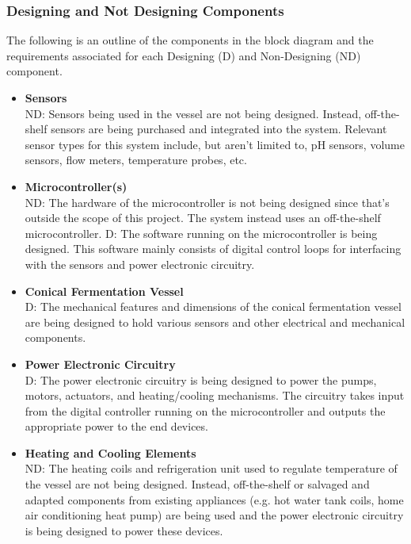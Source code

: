 \documentclass{article}
\begin{document}
\subsubsection{Designing and Not Designing Components}
The following is an outline of the components in the block diagram and the requirements associated for each Designing (D) and Non-Designing (ND) component.

\begin{itemize}
\item\textbf{Sensors}
\\ND: Sensors being used in the vessel are not being designed.  Instead, off-the-shelf sensors are being purchased and integrated into the system.  Relevant sensor types for this system include, but aren't limited to, pH sensors, volume sensors, flow meters, temperature probes, etc.

\item\textbf{Microcontroller(s)}
\\ND: The hardware of the microcontroller is not being designed since that's outside the scope of this project. The system instead uses an off-the-shelf microcontroller.
D: The software running on the microcontroller is being designed. This software mainly consists of digital control loops for interfacing with the sensors and power electronic circuitry.

\item\textbf{Conical Fermentation Vessel}
\\D: The mechanical features and dimensions of the conical fermentation vessel are being designed to hold various sensors and other electrical and mechanical components. 

\item\textbf{Power Electronic Circuitry}
\\D: The power electronic circuitry is being designed to power the pumps, motors, actuators, and heating/cooling mechanisms. The circuitry takes input from the digital controller running on the microcontroller and outputs the appropriate power to the end devices.

\item\textbf{Heating and Cooling Elements}
\\ND: The heating coils and refrigeration unit used to regulate temperature of the vessel are not being designed. Instead, off-the-shelf or salvaged and adapted components from existing appliances (e.g. hot water tank coils, home air conditioning heat pump) are being used and the power electronic circuitry is being designed to power these devices.


\end{itemize}
\end{document}
